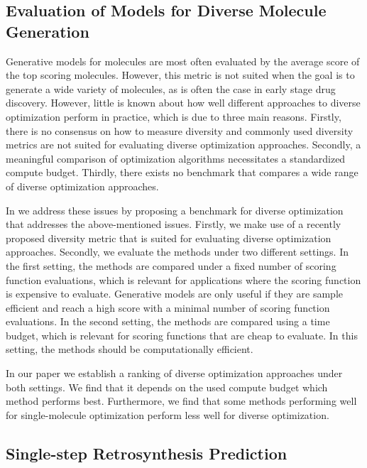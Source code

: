 \subsection{Evaluation of Models for Diverse Molecule Generation\label{sec:overview-diverse-efficiency}}
Generative models for molecules are most often evaluated by the average score of
the top scoring molecules. However, this metric is not suited when the goal is to
generate a wide variety of molecules, as is often the case in early stage drug
discovery. However, little is known about how well different approaches to
diverse optimization perform in practice, which is due to three main reasons.
Firstly, there is no consensus on how to measure diversity and commonly used
diversity metrics are not suited for evaluating diverse optimization approaches.
Secondly, a meaningful comparison of optimization algorithms necessitates a
standardized compute budget. Thirdly, there exists no benchmark that compares
a wide range of diverse optimization approaches.

In \citep{renzBenchmarkingEfficiencyGenerative2024} we address these issues by
proposing a benchmark for diverse optimization that addresses the above-mentioned
issues. Firstly, we make use of a recently proposed diversity metric that is
suited for evaluating diverse optimization approaches. Secondly, we evaluate
the methods under two different settings. In the first setting, the methods are
compared under a fixed number of scoring function evaluations, which is relevant
for applications where the scoring function is expensive to evaluate. Generative
models are only useful if they are sample efficient and reach a high score with a
minimal number of scoring function evaluations. In the second setting, the methods
are compared using a time budget, which is relevant for scoring functions that are
cheap to evaluate. In this setting, the methods should be computationally efficient.

In our paper we establish a ranking of diverse optimization approaches under both settings.
We find that it depends on the used compute budget which method performs best.
Furthermore, we find that some methods performing well for single-molecule optimization
perform less well for diverse optimization.

\subsection{Single-step Retrosynthesis Prediction\label{sec:overview-mhn-react}}

